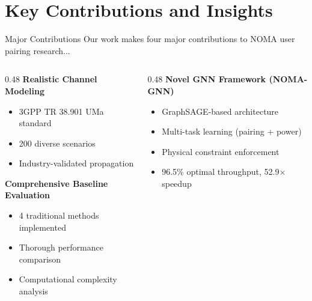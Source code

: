 \documentclass[aspectratio=169]{beamer}
\begin{document}
\section{Key Contributions and Insights}

\begin{frame}{Major Contributions}
\vspace{-0.2cm}
\small \textcolor{iiitblue}{Our work makes four major contributions to NOMA user pairing research...}

\begin{columns}
        \begin{column}{0.48\textwidth}
            \textbf{Realistic Channel Modeling}
            \begin{itemize}
                \item 3GPP TR 38.901 UMa standard
                \item 200 diverse scenarios
                \item Industry-validated propagation
            \end{itemize}

            \vspace{0.4cm}

            \textbf{Comprehensive Baseline Evaluation}
            \begin{itemize}
                \item 4 traditional methods implemented
                \item Thorough performance comparison
                \item Computational complexity analysis
            \end{itemize}
        \end{column}

        \begin{column}{0.48\textwidth}
            \textbf{Novel GNN Framework (NOMA-GNN)}
            \begin{itemize}
                \item GraphSAGE-based architecture
                \item Multi-task learning (pairing + power)
                \item Physical constraint enforcement
                \item 96.5\% optimal throughput, 52.9× speedup
            \end{itemize}

            \vspace{0.4cm}


\end{column}
\end{columns}
\end{frame}
\end{document}
